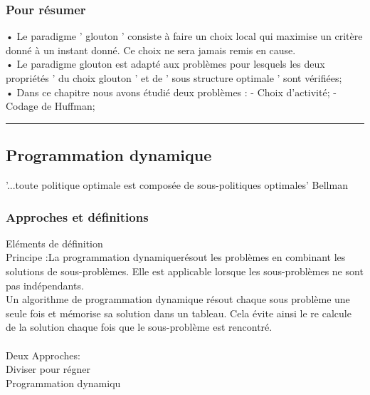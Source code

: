 \documentclass[5pt]{article}
\begin{document}
\begin{scriptsize}
\subsubsection{Pour résumer}
• Le paradigme ' glouton ' consiste à faire un choix local qui maximise un critère donné à un instant donné. Ce choix ne sera jamais remis en cause.\\
• Le paradigme glouton est adapté aux problèmes pour lesquels les deux propriétés ' du choix glouton ' et de ' sous structure optimale ' sont vérifiées;\\
• Dans ce chapitre nous avons étudié deux problèmes : - Choix d’activité; - Codage de Huffman;
\\\hrule\noindent
\subsection{Programmation dynamique }
'...toute politique optimale est composée de sous-politiques optimales' Bellman
\subsubsection{Approches et définitions}
Eléments de définition\\
Principe :La programmation dynamiquerésout les problèmes en combinant les solutions de sous-problèmes. Elle est applicable lorsque les sous-problèmes ne sont pas indépendants.\\
Un algorithme de programmation dynamique résout chaque sous problème une seule fois et mémorise sa solution dans un tableau. Cela évite ainsi le re calcule de la solution chaque fois que le sous-problème est rencontré.\\
\\
Deux Approches:\\Diviser pour régner\\Programmation dynamiqu\\

\end{scriptsize}
\end{document}
